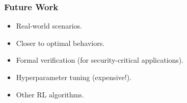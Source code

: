 \begin{frame}
    \frametitle{Future Work}

    \begin{itemize}
        \item Real-world scenarios.
        \item Closer to optimal behaviors.
        \item Formal verification (for security-critical applications).
        \item Hyperparameter tuning (expensive!).
        \item Other RL algorithms.
    \end{itemize}
\end{frame}
